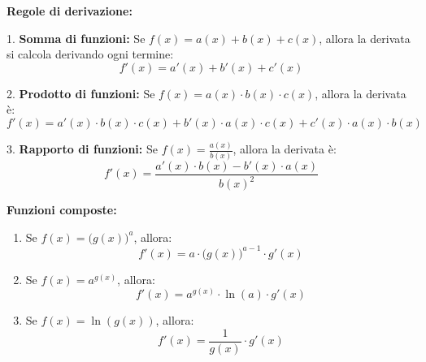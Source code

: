 \documentclass[12pt]{article}
\begin{document}
\Huge

\textbf{Regole di derivazione:}  

\vspace{0.5cm}

1. \textbf{Somma di funzioni:}  
Se \( f(x) = a(x) + b(x) + c(x) \), allora la derivata si calcola derivando ogni termine:  
\[
f'(x) = a'(x) + b'(x) + c'(x)
\]

\vspace{0.5cm}

2. \textbf{Prodotto di funzioni:}  
Se \( f(x) = a(x) \cdot b(x) \cdot c(x) \), allora la derivata è:  
\[
f'(x) = a'(x) \cdot b(x) \cdot c(x) + b'(x) \cdot a(x) \cdot c(x) + c'(x) \cdot a(x) \cdot b(x)
\]

\vspace{0.5cm}

3. \textbf{Rapporto di funzioni:}  
Se \( f(x) = \frac{a(x)}{b(x)} \), allora la derivata è:  
\[
f'(x) = \frac{a'(x) \cdot b(x) - b'(x) \cdot a(x)}{b(x)^2}
\]

\vspace{0.5cm}

\textbf{Funzioni composte:}  

\vspace{0.5cm}

\begin{enumerate}
    \item Se \( f(x) = \big(g(x)\big)^a \), allora:  
    \[
    f'(x) = a \cdot \big(g(x)\big)^{a - 1} \cdot g'(x)
    \]

    \vspace{0.5cm}

    \item Se \( f(x) = a^{g(x)} \), allora:  
    \[
    f'(x) = a^{g(x)} \cdot \ln(a) \cdot g'(x)
    \]

    \vspace{0.5cm}

    \item Se \( f(x) = \ln(g(x)) \), allora:  
    \[
    f'(x) = \frac{1}{g(x)} \cdot g'(x)
    \]
\end{enumerate}
\end{document}
